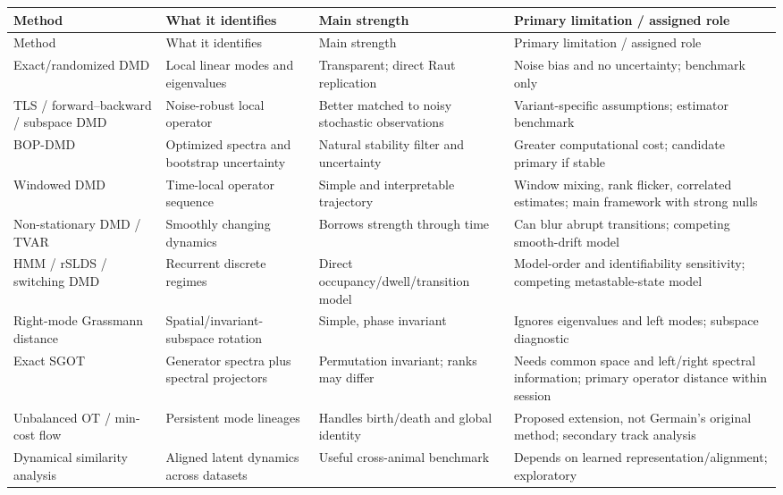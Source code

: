\documentclass[11pt,a4paper]{article}
\begin{document}
\begin{longtable}{@{}P{0.18\textwidth}P{0.25\textwidth}P{0.27\textwidth}P{0.22\textwidth}@{}}
\toprule
Method & What it identifies & Main strength & Primary limitation / assigned role\\
\midrule
\endfirsthead
\toprule
Method & What it identifies & Main strength & Primary limitation / assigned role\\
\midrule
\endhead
Exact/randomized DMD & Local linear modes and eigenvalues & Transparent; direct Raut replication & Noise bias and no uncertainty; benchmark only\\
TLS / forward--backward / subspace DMD & Noise-robust local operator & Better matched to noisy stochastic observations & Variant-specific assumptions; estimator benchmark\\
BOP-DMD & Optimized spectra and bootstrap uncertainty & Natural stability filter and uncertainty & Greater computational cost; candidate primary if stable\\
Windowed DMD & Time-local operator sequence & Simple and interpretable trajectory & Window mixing, rank flicker, correlated estimates; main framework with strong nulls\\
Non-stationary DMD / TVAR & Smoothly changing dynamics & Borrows strength through time & Can blur abrupt transitions; competing smooth-drift model\\
HMM / rSLDS / switching DMD & Recurrent discrete regimes & Direct occupancy/dwell/transition model & Model-order and identifiability sensitivity; competing metastable-state model\\
Right-mode Grassmann distance & Spatial/invariant-subspace rotation & Simple, phase invariant & Ignores eigenvalues and left modes; subspace diagnostic\\
Exact SGOT & Generator spectra plus spectral projectors & Permutation invariant; ranks may differ & Needs common space and left/right spectral information; primary operator distance within session\\
Unbalanced OT / min-cost flow & Persistent mode lineages & Handles birth/death and global identity & Proposed extension, not Germain's original method; secondary track analysis\\
Dynamical similarity analysis & Aligned latent dynamics across datasets & Useful cross-animal benchmark & Depends on learned representation/alignment; exploratory\\
\bottomrule
\end{longtable}
\end{document}
